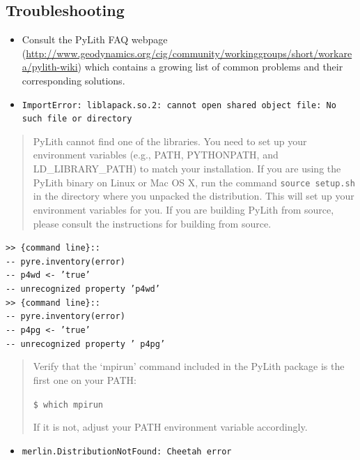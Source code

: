 \subsection{Troubleshooting\label{sec:Troubleshooting}}
\begin{itemize}
\item Consult the PyLith FAQ webpage (\url{http://www.geodynamics.org/cig/community/workinggroups/short/workarea/pylith-wiki})
which contains a growing list of common problems and their corresponding
solutions.
\item \texttt{ImportError: liblapack.so.2: cannot open shared object file: No
such file or directory}\end{itemize}
\begin{quote}
PyLith cannot find one of the libraries. You need to set up your environment
variables (e.g., PATH, PYTHONPATH, and LD\_LIBRARY\_PATH) to match
your installation. If you are using the PyLith binary on Linux or
Mac OS X, run the command \texttt{source setup.sh }in the directory
where you unpacked the distribution. This will set up your environment
variables for you. If you are building PyLith from source, please
consult the instructions for building from source.\end{quote}
\begin{itemize}
\begin{singlespace}
\item \texttt{>\textcompwordmark{}> \{command line\}:: } \\
\texttt{-{}- pyre.inventory(error) } \\
\texttt{-{}- p4wd <- 'true' } \\
\texttt{-{}- unrecognized property 'p4wd' } \\
\texttt{>\textcompwordmark{}> \{command line\}:: } \\
\texttt{-{}- pyre.inventory(error) } \\
\texttt{-{}- p4pg <- 'true' } \\
\texttt{-{}- unrecognized property ' p4pg'}\end{singlespace}
\end{itemize}
\begin{quote}
Verify that the `mpirun' command included in the PyLith package is
the first one on your PATH:

\texttt{\$ which mpirun}

If it is not, adjust your PATH environment variable accordingly.\end{quote}
\begin{itemize}
\item \texttt{\textquotedbl{}merlin.DistributionNotFound: Cheetah\textquotedbl{}
error}\end{itemize}
